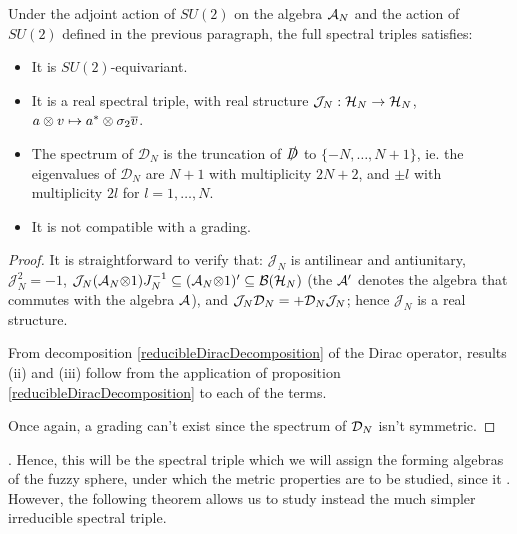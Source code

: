 \begin{theorem}
Under the adjoint action of $SU(2)$ on the algebra $\mathcal A_N$ and the action of $SU(2)$ defined in the previous paragraph, the full spectral triples satisfies:
    \begin{itemize}
    
    \item It is $SU(2)$-equivariant.
    
    \item It is a real spectral triple, with real structure $\mathcal J_N: \mathcal H_N \to \mathcal H_N$, $a \otimes v \mapsto a^* \otimes \sigma_2 \overline{v}$.
    
    \item The spectrum of $\mathcal D_N$ is the truncation of $\slashed D$ to $\{-N, \dots, N+1\}$, ie. the eigenvalues of $\mathcal D_N$ are $N+1$ with multiplicity $2N+2$, and $\pm l$ with multiplicity $2l$ for $l = 1, \dots, N$.
    
    \item It is not compatible with a grading.
    
    \end{itemize}
\end{theorem}

\begin{proof}
It is straightforward to verify that: $\mathcal J_N$ is antilinear and antiunitary, $\mathcal J_N^2 = - 1$, $\mathcal J_N (\mathcal A_N \mathcal\otimes 1) J_N^{-1} \subseteq (\mathcal A_N \mathcal\otimes 1)' \subseteq \mathcal B(\mathcal H_N)$ (the $\mathcal A '$ denotes the algebra that commutes with the algebra $\mathcal A$), and $\mathcal J_N \mathcal D_N = + \mathcal D_N \mathcal J_N$; hence $\mathcal J_N$ is a real structure.

From decomposition \eqref{reducibleDiracDecomposition} of the Dirac operator, results (ii) and (iii) follow from the application of proposition \ref{reducibleDiracDecomposition} to each of the terms.

Once again, a grading can't exist since the spectrum of $\mathcal D_N$ isn't symmetric.
\end{proof}

. Hence, this will be the spectral triple which we will assign the forming algebras of the fuzzy sphere, under which the metric properties are to be studied, since it . However, the following theorem allows us to study instead the much simpler irreducible spectral triple.

